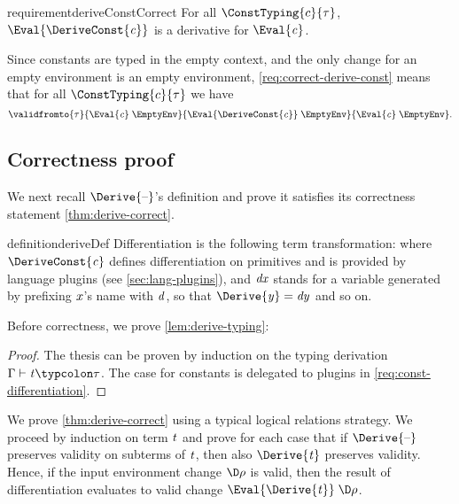 \begin{restatable}{requirement}{deriveConstCorrect}
  \label{req:correct-derive-const}
  For all $\ConstTyping{c}{\tau}$, \ensuremath{\Eval{\DeriveConst{\Varid{c}}}} is a derivative for
  \ensuremath{\Eval{\Varid{c}}}.
\end{restatable}
Since constants are typed in the empty context, and the only change for an empty environment is an empty environment, \cref{req:correct-derive-const} means that for all $\ConstTyping{c}{\tau}$ we have
\[\ensuremath{\validfromto{\tau}{\Eval{\Varid{c}}\;\EmptyEnv}{\Eval{\DeriveConst{\Varid{c}}}\;\EmptyEnv}{\Eval{\Varid{c}}\;\EmptyEnv}}.\]

\subsection{Correctness proof}
\label{sec:derive-correct-proof}
We next recall \ensuremath{\Derive{\text{\textendash}}}'s definition and prove it satisfies
its correctness statement \cref{thm:derive-correct}.
\begin{fullCompile}
\deriveDef*
\end{fullCompile}
\begin{partCompile}
\begin{restatable}[Differentiation]{definition}{deriveDef}
  \label{def:derive}
Differentiation is the following term transformation:
\deriveDefCore
where \ensuremath{\DeriveConst{\Varid{c}}} defines differentiation on primitives and
is provided by language plugins (see \cref{sec:lang-plugins}),
and \ensuremath{\Varid{dx}} stands for a variable generated by prefixing \ensuremath{\Varid{x}}'s
name with \ensuremath{\Varid{d}}, so that \ensuremath{\Derive{\Varid{y}}\mathrel{=}\Varid{dy}} and so on.%
\end{restatable}
\end{partCompile}

Before correctness, we prove \cref{lem:derive-typing}:
\deriveTyping*
\begin{proof}
  The thesis can be proven by induction on the typing derivation
  \ensuremath{\Gamma\vdash\Varid{t}\typcolon\tau}. The case for constants is delegated to plugins in
  \cref{req:const-differentiation}.
\end{proof}

We prove \cref{thm:derive-correct} using a typical logical relations strategy.
We proceed by induction on term \ensuremath{\Varid{t}} and prove for each case that if
\ensuremath{\Derive{\text{\textendash}}} preserves validity on subterms of \ensuremath{\Varid{t}}, then also \ensuremath{\Derive{\Varid{t}}}
preserves validity. Hence, if the input environment change \ensuremath{\D\rho} is valid, then
the result of differentiation evaluates to valid change \ensuremath{\Eval{\Derive{\Varid{t}}}\;\D\rho}.

